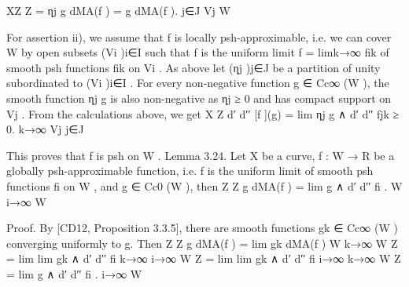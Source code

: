 \documentclass[
  10pt,
]{article}
\newenvironment{Shaded}{}{}
\newcommand{\NormalTok}[1]{#1}
\begin{document}
\begin{Shaded}
\begin{Highlighting}[]
\NormalTok{                              XZ                              Z}
\NormalTok{                        =                 ηj g dMA(f ) =              g dMA(f ).}
\NormalTok{                              j∈J    Vj                           W}

\NormalTok{For assertion ii), we assume that f is locally psh{-}approximable, i.e. we can cover W}
\NormalTok{by open subsets (Vi )i∈I such that f is the uniform limit f = limk→∞ fik of smooth}
\NormalTok{psh functions fik on Vi . As above let (ηj )j∈J be a partition of unity subordinated to}
\NormalTok{(Vi )i∈I . For every non{-}negative function g ∈ Cc∞ (W ), the smooth function ηj g is also}
\NormalTok{non{-}negative as ηj ≥ 0 and has compact support on Vj . From the calculations above,}
\NormalTok{we get}
\NormalTok{                                         X     Z}
\NormalTok{                        d′ d′′ [f ](g) =   lim   ηj g ∧ d′ d′′ fjk ≥ 0.}
\NormalTok{                                                       k→∞ Vj}
\NormalTok{                                                 j∈J}

\NormalTok{This proves that f is psh on W .                                                                                    }
\NormalTok{Lemma 3.24. Let X be a curve, f : W → R be a globally psh{-}approximable function,}
\NormalTok{i.e. f is the uniform limit of smooth psh functions fi on W , and g ∈ Cc0 (W ), then}
\NormalTok{                           Z                     Z}
\NormalTok{                                g dMA(f ) = lim     g ∧ d′ d′′ fi .}
\NormalTok{                                    W                     i→∞ W}

\NormalTok{Proof. By [CD12, Proposition 3.3.5], there are smooth functions gk ∈ Cc∞ (W ) converging}
\NormalTok{uniformly to g. Then}
\NormalTok{                     Z                        Z}
\NormalTok{                          g dMA(f ) = lim        gk dMA(f )}
\NormalTok{                       W                 k→∞ W}
\NormalTok{                                                  Z}
\NormalTok{                                      = lim lim       gk ∧ d′ d′′ fi}
\NormalTok{                                         k→∞ i→∞ W}
\NormalTok{                                                  Z}
\NormalTok{                                      = lim lim       gk ∧ d′ d′′ fi}
\NormalTok{                                         i→∞ k→∞ W}
\NormalTok{                                              Z}
\NormalTok{                                      = lim      g ∧ d′ d′′ fi .}
\NormalTok{                                                        i→∞ W}



\end{Highlighting}
\end{Shaded}
\end{document}
